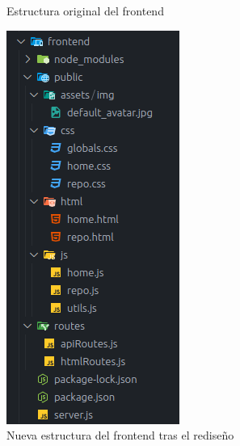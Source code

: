 \documentclass[a4paper, 12pt]{book}
\begin{document}
\begin{figure}[htbp]
\begin{minipage}[t]{0.35\textwidth}
    \caption{Estructura original del frontend}
    \label{fig:original_structure}
  \end{minipage}
  \hspace{0.1\textwidth}
  \begin{minipage}[t]{0.35\textwidth}
    \centering
    \includegraphics[width=\textwidth, keepaspectratio]{img/tree_frontend_final.png}
    \caption{Nueva estructura del frontend tras el rediseño}
    \label{fig:new_structure}
  \end{minipage}
\end{figure}
\end{document}
